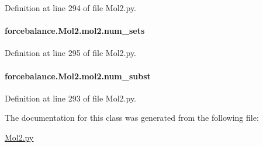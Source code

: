 Definition at line 294 of file Mol2.\-py.

\hypertarget{classforcebalance_1_1Mol2_1_1mol2_ac609df48177165a60d5277709c3e5476}{
\paragraph[{num\-\_\-sets}]{\setlength{\rightskip}{0pt plus 5cm}forcebalance.\-Mol2.\-mol2.\-num\-\_\-sets}}\label{classforcebalance_1_1Mol2_1_1mol2_ac609df48177165a60d5277709c3e5476}


Definition at line 295 of file Mol2.\-py.

\hypertarget{classforcebalance_1_1Mol2_1_1mol2_ad4d5d6e9ac482b18da6dcfd13fa207fc}{
\paragraph[{num\-\_\-subst}]{\setlength{\rightskip}{0pt plus 5cm}forcebalance.\-Mol2.\-mol2.\-num\-\_\-subst}}\label{classforcebalance_1_1Mol2_1_1mol2_ad4d5d6e9ac482b18da6dcfd13fa207fc}


Definition at line 293 of file Mol2.\-py.



The documentation for this class was generated from the following file\-:\begin{DoxyCompactItemize}
\item 
\hyperlink{Mol2_8py}{Mol2.\-py}\end{DoxyCompactItemize}
